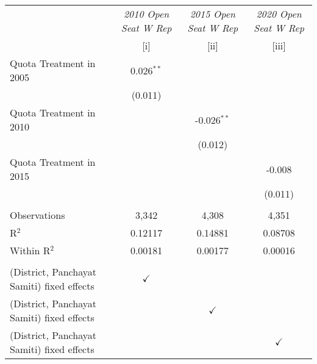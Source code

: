 
\begingroup
\centering
\begin{tabular}{lccc}
   \toprule
                                              & \textit{2010 Open Seat W Rep}  & \textit{2015 Open Seat W Rep}  & \textit{2020 Open Seat W Rep}\\   
                                              & [i]                            & [ii]                           & [iii]\\  
   \midrule 
   Quota Treatment in 2005                    & 0.026$^{**}$                   &                                &   \\   
                                              & (0.011)                        &                                &   \\   
   Quota Treatment in 2010                    &                                & -0.026$^{**}$                  &   \\   
                                              &                                & (0.012)                        &   \\   
   Quota Treatment in 2015                    &                                &                                & -0.008\\   
                                              &                                &                                & (0.011)\\   
    \\
   Observations                               & 3,342                          & 4,308                          & 4,351\\  
   R$^2$                                      & 0.12117                        & 0.14881                        & 0.08708\\  
   Within R$^2$                               & 0.00181                        & 0.00177                        & 0.00016\\  
    \\
   (District, Panchayat Samiti) fixed effects & $\checkmark$                   &                                & \\  
   (District, Panchayat Samiti) fixed effects &                                & $\checkmark$                   & \\  
   (District, Panchayat Samiti) fixed effects &                                &                                & $\checkmark$\\   
   \bottomrule
\end{tabular}
\par\endgroup


